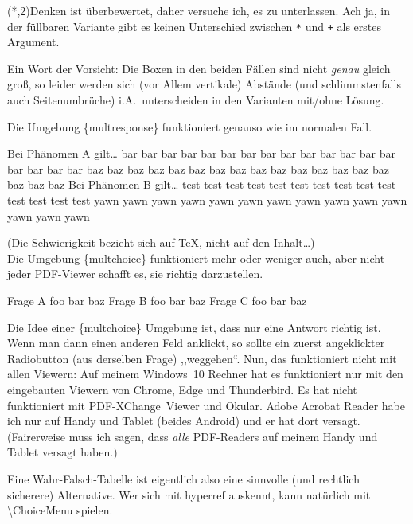\documentclass[hyperworksheet]{drcschool}
\newcommand*{\cs}[1]{\textup{\ttfamily\textbackslash#1}}                   %
\newcommand*{\pkg}[1]{\textup{\ttfamily#1}}                                %
\newcommand*{\env}[1]{\textup{\ttfamily\{#1\}}}                            %
\begin{document}
\begin{hyperworksheet}
\grid(*,2){Denken ist überbewertet, daher versuche ich, es zu unterlassen. Ach ja, in der füllbaren Variante gibt es keinen
Unterschied zwischen \texttt{*} und \texttt{+} als erstes Argument.}

\noindent
Ein Wort der Vorsicht: Die Boxen in den beiden Fällen sind nicht \emph{genau}
gleich groß, so leider werden
sich (vor Allem vertikale) Abstände (und schlimmstenfalls auch Seitenumbrüche) i.A.~unterscheiden
in den Varianten mit/ohne Lösung.

\easy{}
Die Umgebung \env{multresponse} funktioniert genauso wie im normalen Fall.
\begin{multresponse}
\question Bei Phänomen A gilt\ldots
\choice* bar bar bar bar bar bar bar bar bar bar bar bar bar bar bar bar bar bar
\choice* baz baz baz baz baz baz baz baz baz baz baz baz baz baz baz baz baz baz
\question Bei Phänomen B gilt\ldots
\choice* test test test test test test test test test test test test test test
\choice yawn yawn yawn yawn yawn yawn yawn yawn yawn yawn yawn yawn yawn yawn
\end{multresponse}

\hard{}
(Die Schwierigkeit bezieht sich auf \TeX, nicht auf den Inhalt\ldots)\\
Die Umgebung \env{multchoice} funktioniert
mehr oder weniger auch, aber nicht jeder PDF-Viewer schafft es, sie
richtig darzustellen.
\begin{multchoice*}{3}
\question Frage A
\choice foo
\choice* bar
\choice baz
\question Frage B
\choice foo
\choice bar
\choice* baz
\question Frage C
\choice* foo
\choice bar
\choice baz
\end{multchoice*}
Die Idee einer \env{multchoice} Umgebung ist, dass nur eine Antwort richtig
ist. Wenn man dann einen anderen Feld anklickt, so sollte ein zuerst angeklickter
Radiobutton (aus derselben Frage) ,,weggehen``. Nun, das funktioniert nicht mit
allen Viewern: Auf meinem Windows~10 Rechner hat es funktioniert nur mit den
eingebauten Viewern von Chrome, Edge und Thunderbird. Es hat nicht funktioniert
mit PDF-XChange~Viewer und Okular. Adobe Acrobat Reader habe ich nur auf Handy
und Tablet (beides Android) und er hat dort versagt. (Fairerweise muss ich sagen,
dass \emph{alle} PDF-Readers auf meinem Handy und Tablet versagt haben.)

Eine Wahr-Falsch-Tabelle ist eigentlich also eine sinnvolle (und rechtlich sicherere)
Alternative. Wer sich mit \pkg{hyperref} auskennt, kann natürlich mit \cs{ChoiceMenu}
spielen.


\end{hyperworksheet}
\end{document}
